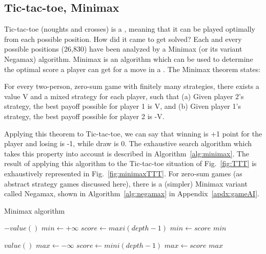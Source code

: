 \subsection{Tic-tac-toe, Minimax}
Tic-tac-toe (noughts and crosses) is a , meaning that it can be played optimally from each possible position. How did it came to get solved? Each and every possible positions (26,830) have been analyzed by a Minimax (or its variant Negamax) algorithm. Minimax is an algorithm which can be used to determine the optimal score a player can get for a move in a . The Minimax theorem states:
\begin{mythm}
For every two-person, zero-sum game with finitely many strategies, there exists a value V and a mixed strategy for each player, such that (a) Given player 2's strategy, the best payoff possible for player 1 is V, and (b) Given player 1's strategy, the best payoff possible for player 2 is -V.
\end{mythm}
Applying this theorem to Tic-tac-toe, we can say that winning is +1 point for the player and losing is -1, while draw is 0. The exhaustive search algorithm which takes this property into account is described in Algorithm~\ref{alg:minimax}. The result of applying this algorithm to the Tic-tac-toe situation of Fig.~\ref{fig:TTT} is exhaustively represented in Fig.~\ref{fig:minimaxTTT}. For zero-sum games (as abstract strategy games discussed here), there is a (simpler) Minimax variant called Negamax, shown in Algorithm~\ref{alg:negamax} in Appendix~\ref{apdx:gameAI}.
\begin{algorithm}
\caption{Minimax algorithm}
\label{alg:minimax}
\begin{algorithmic}
        \State \Return $-value()$
    \EndIf
    \State $min \gets +\infty$
        \State $score \gets maxi(depth-1)$
            \State $min \gets score$
        \EndIf 
    \EndFor
    \State \Return $min$
\EndFunction

        \State \Return $value()$
    \EndIf
    \State $max \gets -\infty$
        \State $score \gets mini(depth-1)$
            \State $max \gets score$
        \EndIf
    \EndFor 
    \State \Return $max$
\EndFunction
\end{algorithmic}
\end{algorithm}

